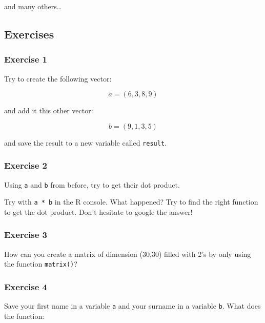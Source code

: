 \documentclass[]{gitbook}
\begin{document}
and many others\ldots{}

\hypertarget{exercises-1}{%
\subsection{Exercises}\label{exercises-1}}

\hypertarget{exercise-1-1}{%
\subsubsection*{Exercise 1}\label{exercise-1-1}}

Try to create the following vector:

\[a = (6,3,8,9)\]

and add it this other vector:

\[b = (9,1,3,5)\]

and save the result to a new variable called \texttt{result}.

\hypertarget{exercise-2}{%
\subsubsection*{Exercise 2}\label{exercise-2}}

Using \texttt{a} and \texttt{b} from before, try to get their dot product.

Try with \texttt{a\ *\ b} in the R console. What happened?
Try to find the right function to get the dot product. Don't hesitate to google the answer!

\hypertarget{exercise-3}{%
\subsubsection*{Exercise 3}\label{exercise-3}}

How can you create a matrix of dimension (30,30) filled with 2's by only using the function \texttt{matrix()}?

\hypertarget{exercise-4}{%
\subsubsection*{Exercise 4}\label{exercise-4}}

Save your first name in a variable \texttt{a} and your surname in a variable \texttt{b}. What does the function:
\end{document}
